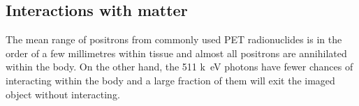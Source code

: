 \begin{table}[htbp]
  \caption[Commonly used radioisotopes and their relevant characteristics for PET imaging.]{Commonly used radioisotopes and their relevant characteristics for PET imaging~\cite{Conti2016}.}
\label{tab:radioisotopes}%
\end{table}%

\subsection{Interactions with matter}
The mean range of positrons from commonly used PET radionuclides is in the order of a few millimetres within tissue and almost all positrons are annihilated within the body.
On the other hand, the 511 \si{k\electronvolt} photons have fewer chances of interacting within the body and a large fraction of them will exit the imaged object without interacting. 

